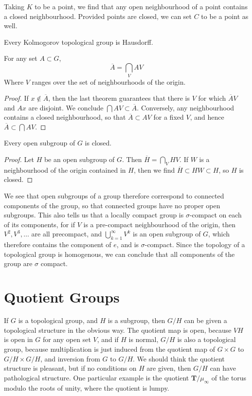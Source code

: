 Taking $K$ to be a point, we find that any open neighbourhood of a point contains a closed neighbourhood. Provided points are closed, we can set $C$ to be a point as well.

\begin{corollary}
    Every Kolmogorov topological group is Hausdorff.
\end{corollary}

\begin{theorem}
    For any set $A \subset G$,
    \[ \overline{A} = \bigcap_V AV \]
    Where $V$ ranges over the set of neighbourhoods of the origin.
\end{theorem}
\begin{proof}
    If $x \not \in \overline{A}$, then the last theorem guarantees that there is $V$ for which $\overline{A}V$ and $Ax$ are disjoint. We conclude $\bigcap AV \subset \overline{A}$. Conversely, any neighbourhood contains a closed neighbourhood, so that $\overline{A} \subset AV$ for a fixed $V$, and hence $\overline{A} \subset \bigcap AV$.
\end{proof}

\begin{theorem}
    Every open subgroup of $G$ is closed.
\end{theorem}
\begin{proof}
    Let $H$ be an open subgroup of $G$. Then $\overline{H} = \bigcap_V HV$. If $W$ is a neighbourhood of the origin contained in $H$, then we find $\overline{H} \subset HW \subset H$, so $H$ is closed.
\end{proof}

We see that open subgroups of a group therefore correspond to connected components of the group, so that connected groups have no proper open subgroups. This also tells us that a locally compact group is $\sigma$-compact on each of its components, for if $V$ is a pre-compact neighbourhood of the origin, then $V^2, V^3, \dots$ are all precompact, and $\bigcup_{k = 1}^\infty V^k$ is an open subgroup of $G$, which therefore contains the component of $e$, and is $\sigma$-compact. Since the topology of a topological group is homogenous, we can conclude that all components of the group are $\sigma$ compact.

\section{Quotient Groups}

If $G$ is a topological group, and $H$ is a subgroup, then $G/H$ can be given a topological structure in the obvious way. The quotient map is open, because $VH$ is open in $G$ for any open set $V$, and if $H$ is normal, $G/H$ is also a topological group, because multiplication is just induced from the quotient map of $G \times G$ to $G/H \times G/H$, and inversion from $G$ to $G/H$. We should think the quotient structure is pleasant, but if no conditions on $H$ are given, then $G/H$ can have pathological structure. One particular example is the quotient $\mathbf{T}/\mu_\infty$ of the torus modulo the roots of unity, where the quotient is lumpy.

